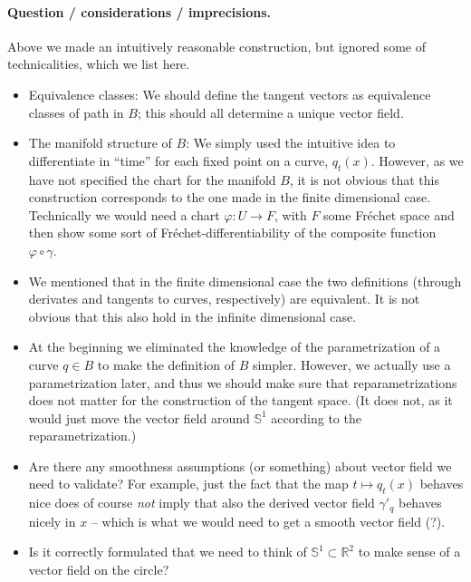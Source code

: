 \documentclass[a4,danish]{article}
\theoremstyle{break}
\theoremstyle{definition}
\theoremstyle{Break}
\newcommand{\R}{\mathbb{R}}
\renewcommand{\S}{\mathbb{S}}
\renewcommand{\phi}{\varphi}
\begin{document}
\paragraph{Question / considerations / imprecisions.}
Above we made an intuitively reasonable construction, but ignored some
of technicalities, which we list here.
\begin{itemize}
\item Equivalence classes: We should define the tangent vectors as
  equivalence classes of path in $B$; this should all determine a
  unique vector field.
\item The manifold structure of $B$: We simply used the intuitive idea
  to differentiate in ``time'' for each fixed point on a curve,
  $q_t(x)$. However, as we have not specified the chart for the
  manifold $B$, it is not obvious that this construction corresponds
  to the one made in the finite dimensional case. Technically we
  would need a chart $\phi \colon U \rightarrow F$, with $F$ some
  Fr\'echet space and then show some sort of Fr\'echet-differentiability of the
  composite function $\phi \circ \gamma$.
\item We mentioned that in the finite dimensional case the two
  definitions (through derivates and tangents to curves, respectively)
  are equivalent. It is not obvious that this also hold in the
  infinite dimensional case.
\item At the beginning we eliminated the knowledge of the
  parametrization of a curve $q \in B$ to make the definition of $B$
  simpler. However, we actually use a parametrization later, and thus
  we should make sure that reparametrizations does not matter for the
  construction of the tangent space. (It does not, as it would just
  move the vector field around $\S^1$ according to the
  reparametrization.)
\item Are there any smoothness assumptions (or something) about vector
  field we need to validate? For example, just the fact that the map
  $t \mapsto q_t(x)$ behaves nice does of course \textit{not} imply
  that also the derived vector field $\gamma'_q$ behaves nicely in
  $x$ -- which is what we would need to get a smooth vector field
  (?).
\item Is it correctly formulated that we need to think of $\S^1
  \subset \R^2$ to make sense of a vector field on the circle?
\end{itemize}


\end{document}
